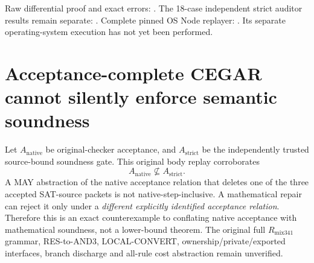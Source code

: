\documentclass[10pt]{article}
\begin{document}
Raw differential proof and exact errors:
.
The 18-case independent strict auditor results remain separate:
.
Complete pinned OS Node replayer:
.
Its separate operating-system execution has not yet been performed.

\section*{Acceptance-complete CEGAR cannot silently enforce semantic soundness}
Let $A_{\mathrm{native}}$ be original-checker acceptance,
and $A_{\mathrm{strict}}$ be the independently trusted source-bound
soundness gate. This original body replay corroborates
\[
A_{\mathrm{native}}\not\subseteq A_{\mathrm{strict}}.
\]
A MAY abstraction of the native acceptance relation that
deletes one of the three accepted SAT-source packets is not
native-step-inclusive. A mathematical repair can reject it only
under a \emph{different explicitly identified acceptance relation}.
Therefore this is an exact counterexample to conflating native
acceptance with mathematical soundness, not a lower-bound theorem.
The original full $R_{\mathrm{mix341}}$ grammar, RES-to-AND3,
LOCAL-CONVERT, ownership/private/exported interfaces, branch
discharge and all-rule cost abstraction remain unverified.
\end{document}
